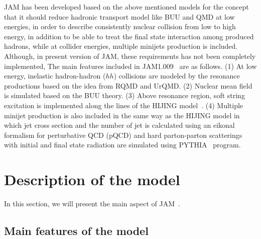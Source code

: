 \documentclass[]{article}
\def\VERSION{1.009}
\begin{document}
JAM has been developed based on the above mentioned models
 for the concept that
 it should reduce hadronic transport model like BUU and QMD at low energies,
 in order to describe consistently nuclear collision from low to 
 high energy, in addition to be able to treat the final state
 interaction among produced hadrons,
 while at collider energies, multiple minijets production is 
 included.
Although, in present version of JAM, these requirements has not been
 completely implemented,
The main features included in JAM\VERSION~ are as follows.
 (1) At low energy, inelastic hadron-hadron ($hh$) collisions are modeled by
     the resonance productions based on the idea from RQMD and UrQMD.
 (2) Nuclear mean field is simulated based on the BUU theory.
 (3) Above resonance region, soft string excitation is implemented
     along the lines of the HIJING model~\cite{hijing}.
 (4) Multiple minijet production is also included in the same way
     as the HIJING model in which jet cross section and the number
     of jet is calculated using an eikonal formalism for
     perturbative QCD (pQCD) and hard parton-parton scatterings
     with initial and final state radiation are simulated
     using PYTHIA~\cite{pythia} program.








\section{Description of the model}

In this section, we will present the main aspect of JAM~\cite{jam}.

\subsection{Main features of the model}
\end{document}
